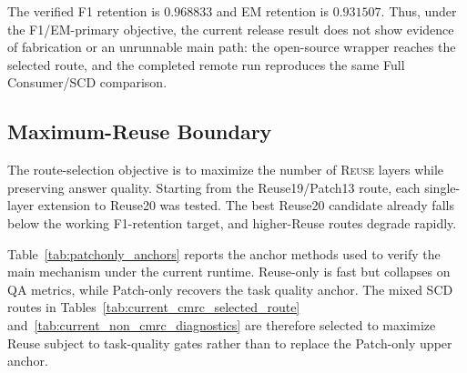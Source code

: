 \documentclass{article}
\theoremstyle{plain}
\theoremstyle{definition}
\theoremstyle{remark}
\begin{document}
The verified F1 retention is $0.968833$ and EM retention is $0.931507$.
Thus, under the F1/EM-primary objective, the current release result does not
show evidence of fabrication or an unrunnable main path: the open-source wrapper
reaches the selected route, and the completed remote run reproduces the same
Full Consumer/SCD comparison.

\subsection{Maximum-Reuse Boundary}
\label{subsec:current_reuse_boundary}

The route-selection objective is to maximize the number of \textsc{Reuse} layers
while preserving answer quality.  Starting from the Reuse19/Patch13 route, each
single-layer extension to Reuse20 was tested.  The best Reuse20 candidate
already falls below the working F1-retention target, and higher-Reuse routes
degrade rapidly.

\begin{table}[t]
  \centering
  \scriptsize
  \caption{\textbf{Quality boundary as Reuse count increases.}
  CMRC2018 dev, $n=200$.  Reuse19/Patch13 is the current maximum verified
  quality-preserving route under the F1/EM-primary criterion.}
  \label{tab:current_reuse_boundary}
  \setlength{\tabcolsep}{3pt}
\end{table}

Table~\ref{tab:patchonly_anchors} reports the anchor methods used to verify the
main mechanism under the current runtime.  Reuse-only is fast but collapses on
QA metrics, while Patch-only recovers the task quality anchor.  The mixed SCD
routes in Tables~\ref{tab:current_cmrc_selected_route}
and~\ref{tab:current_non_cmrc_diagnostics} are therefore selected to maximize
Reuse subject to task-quality gates rather than to replace the Patch-only upper
anchor.
\end{document}
